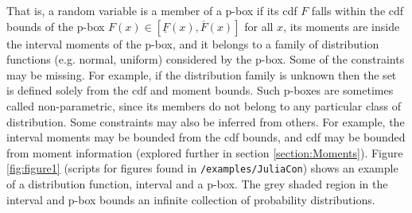 \documentclass{juliacon}
\begin{document}
\noindent That is, a random variable is a member of a p-box if its cdf $F$ falls within the cdf bounds of the p-box $F(x) \in [\underline{F}(x), \overline{F}(x)]$ for all $x$, its moments are inside the interval moments of the p-box, and it belongs to a family of distribution functions (e.g. normal, uniform) considered by the p-box. Some of the constraints may be missing. For example, if the distribution family is unknown then the set is defined solely from the cdf and moment bounds. Such p-boxes are sometimes called non-parametric, since its members do not belong to any particular class of distribution. Some constraints may also be inferred from others. For example, the interval moments may be bounded from the cdf bounds, and cdf may be bounded from moment information (explored further in section \ref{section:Moments}). Figure \ref{fig:figure1} (scripts for figures found in \texttt{/examples/JuliaCon}) shows an example of a distribution function, interval and a p-box. The grey shaded region in the interval and p-box bounds an infinite collection of probability distributions.
\end{document}
